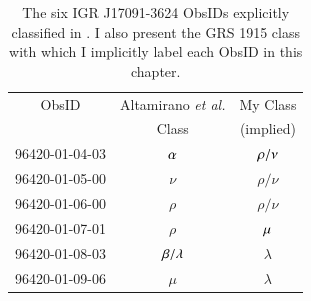 \begin{table}
\centering
\caption[The six IGR J17091-3624 ObsIDs explicitly classified in \citet{Altamirano_IGR_FH}.]{The six IGR J17091-3624 ObsIDs explicitly classified in \citet{Altamirano_IGR_FH}.  I also present the GRS 1915 class with which I implicitly label each ObsID in this chapter.}
\label{tab:me_Diego}
\begin{tabular}{ccc} %
\hline
\hline
ObsID & Altamirano \textit{et al.}& My Class\\
&Class&(implied)\\
\hline
96420-01-04-03&$\alpha\indexalpha$&$\rho\indexrho/\nu\indexnu$\\
96420-01-05-00&$\nu$&$\rho/\nu$\\
96420-01-06-00&$\rho$&$\rho/\nu$\\
96420-01-07-01&$\rho$&$\mu\indexmu$\\
96420-01-08-03&$\beta\indexbeta/\lambda\indexlambda$&$\lambda$\\
96420-01-09-06&$\mu$&$\lambda$\\
\hline
\hline

\end{tabular}
\end{table}


